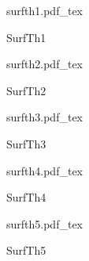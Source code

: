 \documentclass[12pt,a4paper]{article}
\newcommand{\incfig}[1]{%
    \def\svgwidth{\columnwidth}
    {#1.pdf_tex}
}
\begin{document}
\begin{figure}[ht]
    \centering
	\begin{minipage}[c][\totalheight][c]{\columnwidth}
    \incfig{surfth1}
    \caption{SurfTh1}
	\end{minipage}
    \label{fig:surfth1}
\end{figure}

\begin{figure}[ht]
    \centering
	\begin{minipage}[c][\totalheight][c]{\columnwidth}
    \incfig{surfth2}
    \caption{SurfTh2}
	\end{minipage}
    \label{fig:surfth2}
\end{figure}

\begin{figure}[ht]
    \centering
	\begin{minipage}[c][\totalheight][c]{\columnwidth}
    \incfig{surfth3}
    \caption{SurfTh3}
	\end{minipage}
    \label{fig:surfth3}
\end{figure}

\begin{figure}[ht]
    \centering
	\begin{minipage}[c][\totalheight][c]{\columnwidth}
    \incfig{surfth4}
    \caption{SurfTh4}
	\end{minipage}
    \label{fig:surfth4}
\end{figure}

\begin{figure}[ht]
    \centering
	\begin{minipage}[c][\totalheight][c]{\columnwidth}
    \incfig{surfth5}
    \caption{SurfTh5}
	\end{minipage}
    \label{fig:surfth5}
\end{figure}
\end{document}
